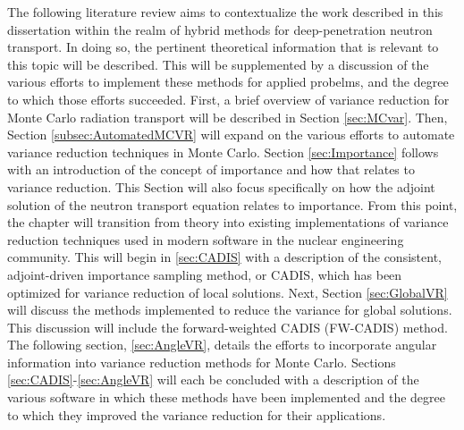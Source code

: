 The following literature review aims to contextualize the work described in this
dissertation within the realm of hybrid methods for deep-penetration
neutron transport. In doing
so, the pertinent theoretical information that is relevant to this
topic will be described.
This will be supplemented by a discussion of the various efforts to implement
these methods for applied probelms, and the degree to which those efforts
succeeded.
First, a brief overview of variance reduction for Monte Carlo radiation transport
will be described in Section \ref{sec:MCvar}.
Then, Section \ref{subsec:AutomatedMCVR} will expand on the
various efforts to automate variance reduction techniques in Monte Carlo.
Section \ref{sec:Importance} follows with an introduction of the concept of
importance and how that relates to variance reduction. This Section will also
focus specifically on how the adjoint solution of the neutron transport equation
relates to importance.
From this point, the chapter will transition
from theory into existing implementations
of variance reduction techniques used in modern software in the nuclear
engineering community. This will begin in \ref{sec:CADIS} with a description of
the consistent, adjoint-driven importance sampling method, or CADIS, which has
been optimized for variance reduction of local solutions. Next, Section
\ref{sec:GlobalVR} will discuss the methods implemented to reduce the variance
for global solutions. This discussion will include
the forward-weighted CADIS (FW-CADIS) method.
The following section, \ref{sec:AngleVR}, details the efforts to incorporate
angular information into variance reduction methods for Monte Carlo.
Sections \ref{sec:CADIS}-\ref{sec:AngleVR} will each be
concluded with a description of the
various software in which these methods have been implemented and the degree to
which they improved the variance reduction for their applications.
